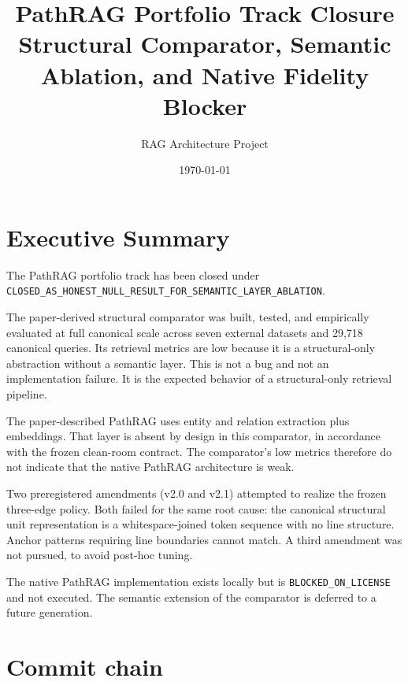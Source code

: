 \documentclass[11pt,a4paper]{article}
\title{PathRAG Portfolio Track Closure\\\large Structural Comparator,
       Semantic Ablation, and Native Fidelity Blocker}
\author{RAG Architecture Project}
\date{\today}
\begin{document}
\maketitle

\section{Executive Summary}

The PathRAG portfolio track has been closed under
\texttt{CLOSED\_AS\_HONEST\_NULL\_RESULT\_FOR\_SEMANTIC\_LAYER\_ABLATION}.

The paper-derived structural comparator was built, tested, and
empirically evaluated at full canonical scale across seven
external datasets and 29{,}718 canonical queries. Its retrieval
metrics are low because it is a structural-only abstraction
without a semantic layer. This is not a bug and not an
implementation failure. It is the expected behavior of a
structural-only retrieval pipeline.

The paper-described PathRAG uses entity and relation extraction
plus embeddings. That layer is absent by design in this
comparator, in accordance with the frozen clean-room contract.
The comparator's low metrics therefore do not indicate that the
native PathRAG architecture is weak.

Two preregistered amendments (v2.0 and v2.1) attempted to
realize the frozen three-edge policy. Both failed for the same
root cause: the canonical structural unit representation is a
whitespace-joined token sequence with no line structure.
Anchor patterns requiring line boundaries cannot match. A third
amendment was not pursued, to avoid post-hoc tuning.

The native PathRAG implementation exists locally but is
\texttt{BLOCKED\_ON\_LICENSE} and not executed. The semantic
extension of the comparator is deferred to a future generation.

\section{Commit chain}
\end{document}
